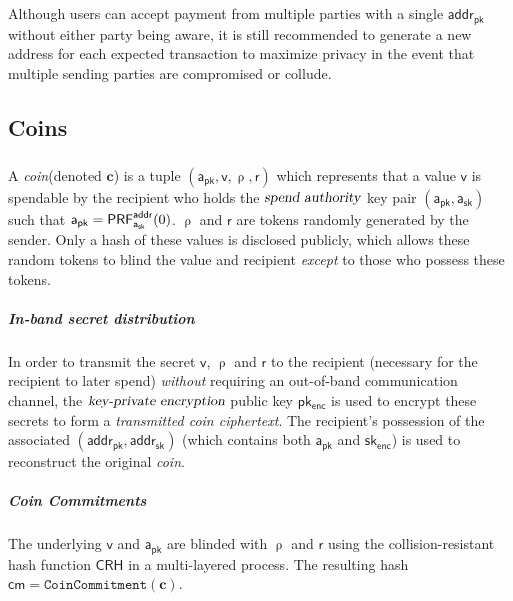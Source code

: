 \documentclass[8pt]{article}
\newcommand{\term}[1]{\textsl{#1}\xspace}
\newcommand{\coin}{\term{coin}}
\newcommand{\transmittedCiphertext}{\term{transmitted coin ciphertext}}
\newcommand{\transmitPublicAlgorithm}{\term{key-private encryption}}
\newcommand{\spendAuthority}{\term{spend authority}}
\newcommand{\PublicAddress}{\mathsf{addr_{pk}}}
\newcommand{\PrivateAddress}{\mathsf{addr_{sk}}}
\newcommand{\SpendAuthorityPublic}{\mathsf{a_{pk}}}
\newcommand{\SpendAuthorityPrivate}{\mathsf{a_{sk}}}
\newcommand{\TransmitPublic}{\mathsf{pk_{enc}}}
\newcommand{\TransmitPrivate}{\mathsf{sk_{enc}}}
\newcommand{\Value}{\mathsf{v}}
\newcommand{\Coin}{\mathbf{c}}
\newcommand{\CoinCommitRand}{\mathsf{r}}
\newcommand{\CoinAddressRand}{\mathsf{\uprho}}
\newcommand{\CRH}{\mathsf{CRH}}
\newcommand{\PRF}[2]{\mathsf{{PRF}^{#2}_\mathnormal{#1}}}
\newcommand{\PRFaddr}[1]{\PRF{#1}{addr}}
\newcommand{\cm}{\mathsf{cm}}
\newcommand{\CoinCommitment}[1]{\mathtt{CoinCommitment}(#1)}
\begin{document}
\subparagraph{}

Although users can accept payment from multiple parties with a single
$\PublicAddress$ without either party being aware, it is still recommended to
generate a new address for each expected transaction to maximize privacy in the
event that multiple sending parties are compromised or collude.

\subsection{Coins}

\subparagraph{}

A \coin (denoted $\Coin$) is a tuple $(\SpendAuthorityPublic, \Value,
\CoinAddressRand, \CoinCommitRand)$ which represents that a value $\Value$ is
spendable by the recipient who holds the $\spendAuthority$ key pair
$(\SpendAuthorityPublic, \SpendAuthorityPrivate)$ such that
$\SpendAuthorityPublic = \PRFaddr{\SpendAuthorityPrivate}(0)$. $\CoinAddressRand$ and
$\CoinCommitRand$ are tokens randomly generated by the sender. Only a hash of
these values is disclosed publicly, which allows these random tokens to blind the
value and recipient \emph{except} to those who possess these tokens.

\subparagraph{In-band secret distribution}

In order to transmit the secret $\Value$, $\CoinAddressRand$ and $\CoinCommitRand$ 
to the recipient (necessary for the recipient to later spend) \emph{without} 
requiring an out-of-band communication channel, the $\transmitPublicAlgorithm$ 
public key $\TransmitPublic$ is used to encrypt these secrets to form a 
\transmittedCiphertext. The recipient's possession of the associated 
$(\PublicAddress, \PrivateAddress)$ (which contains both $\SpendAuthorityPublic$ and 
$\TransmitPrivate$) is used to reconstruct the original \coin.

\subparagraph{Coin Commitments}

The underlying $\Value$ and $\SpendAuthorityPublic$ are blinded with $\CoinAddressRand$
and $\CoinCommitRand$ using the collision-resistant hash function $\CRH$ in a
multi-layered process. The resulting hash $\cm = \CoinCommitment{\Coin}$.
\end{document}
